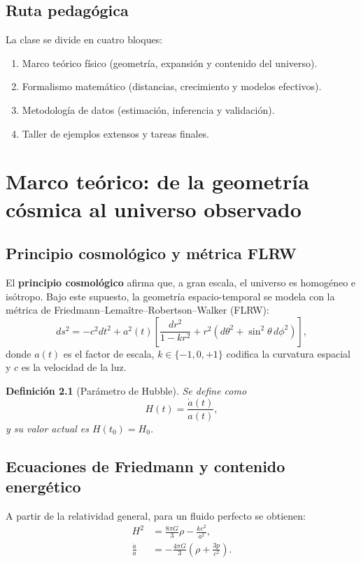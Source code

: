 \documentclass[12pt,oneside]{book}
\newtheorem{definicion}{Definición}[chapter]
\newcommand{\Hcero}{H_0}
\begin{document}
\section{Ruta pedagógica}
La clase se divide en cuatro bloques:
\begin{enumerate}[leftmargin=1.5em]
  \item Marco teórico físico (geometría, expansión y contenido del universo).
  \item Formalismo matemático (distancias, crecimiento y modelos efectivos).
  \item Metodología de datos (estimación, inferencia y validación).
  \item Taller de ejemplos extensos y tareas finales.
\end{enumerate}

\chapter{Marco teórico: de la geometría cósmica al universo observado}

\section{Principio cosmológico y métrica FLRW}

El \textbf{principio cosmológico} afirma que, a gran escala, el universo es homogéneo e isótropo.
Bajo este supuesto, la geometría espacio-temporal se modela con la métrica de
Friedmann--Lemaître--Robertson--Walker (FLRW):
\begin{equation}
  ds^2 = -c^2dt^2 + a^2(t)\left[\frac{dr^2}{1-kr^2}+r^2(d\theta^2+\sin^2\theta\,d\phi^2)\right],
\end{equation}
donde $a(t)$ es el factor de escala, $k\in\{-1,0,+1\}$ codifica la curvatura espacial y
$c$ es la velocidad de la luz.

\begin{definicion}[Parámetro de Hubble]
Se define como
\begin{equation}
  H(t)=\frac{\dot a(t)}{a(t)},
\end{equation}
y su valor actual es $H(t_0)=\Hcero$.
\end{definicion}

\section{Ecuaciones de Friedmann y contenido energético}

A partir de la relatividad general, para un fluido perfecto se obtienen:
\begin{align}
  H^2 &= \frac{8\pi G}{3}\rho -\frac{kc^2}{a^2},\\
  \frac{\ddot a}{a} &= -\frac{4\pi G}{3}\left(\rho+\frac{3p}{c^2}\right).
\end{align}
\end{document}
